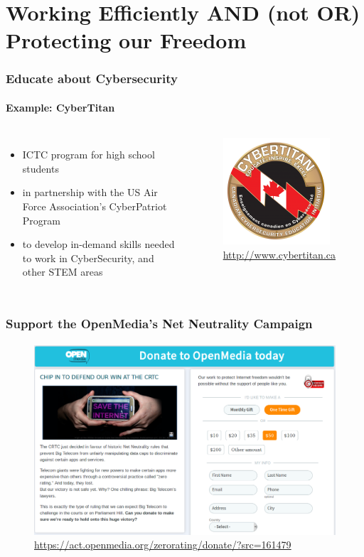 \section[Section]{Working Efficiently AND (not OR) Protecting our Freedom}
	\begin{frame}
	\frametitle{Educate about Cybersecurity}
	\framesubtitle{Example: CyberTitan}
	\begin{columns}
			\begin{itemize}[<+->]
				\item ICTC program for high school students
				\item in partnership with the US Air Force Association’s CyberPatriot Program
				\item to develop in-demand skills needed to work in CyberSecurity, and other STEM areas
			\end{itemize}
	        	\begin{figure}[h]
                	\centering
                	\includegraphics[width=.6\textwidth]{../pics/CP_Cybertitan1-150x150}
			\caption{\url{http://www.cybertitan.ca}}
        		\end{figure}
	\end{columns}
	\end{frame}

	\begin{frame}
	\frametitle{Support the OpenMedia's Net Neutrality Campaign}
	\framesubtitle{}
	        \begin{figure}[h]
                \centering
                \includegraphics[width=.8\textwidth]{../pics/openmedia-donate-re-crtc}
		\caption{\url{https://act.openmedia.org/zerorating/donate/?src=161479}}
        	\end{figure}
	\end{frame}

